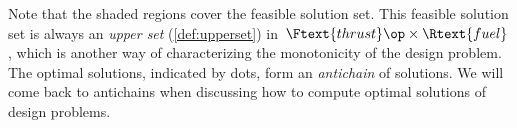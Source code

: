 \begin{example}
    Note that the shaded regions cover the feasible solution set.
    This feasible solution set is always an \emph{upper set} (\cref{def:upperset}) in~$\Ftext{thrust}\op \times \Rtext{fuel}$, which is another way of characterizing the monotonicity of the design problem.
    The optimal solutions, indicated by dots, form an \emph{antichain} of solutions.
    We will come back to antichains when discussing how to compute optimal solutions of design problems.
\end{example}

%
%
%
